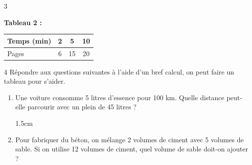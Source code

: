 \documentclass[a4paper]{book}
\begin{document}
{\begin{exerciceNote}{3}
\begin{minipage}{0.45\linewidth}
            \medskip

            \dotfill

            \medskip

            \dotfill
                                    
            \medskip 
            
            \dotfill
        \end{minipage}
        \hfill\vline\hfill
        \begin{minipage}{0.45\linewidth}
            \begin{center}
                \textbf{Tableau 2 :} \begin{tabular}{|l|c|c|c|} 
                \hline Temps (min) & 2 & 5 & 10 \\ 
                \hline Pages & 6 & 15 & 20 \\ \hline 
                \end{tabular}
            \end{center}

            \medskip
            
            \dotfill 
            
            \medskip 
            
            \dotfill
                        
            \medskip 
            
            \dotfill
        \end{minipage}           
    \end{exerciceNote}

    
\newpage


    \begin{exerciceNote}{4}
        Répondre aux questions suivantes à l'aide d'un bref calcul, on peut faire un tableau pour s'aider.

        \begin{enumerate}[leftmargin=*]
            \item Une voiture consomme 5 litres d'essence pour 100 km. Quelle distance peut-elle parcourir avec un plein de 45 litres ?

            \begin{ZoneReponse}{1.5cm}                
            \end{ZoneReponse}

            \item Pour fabriquer du béton, on mélange 2 volumes de ciment avec 5 volumes de sable. Si on utilise 12 volumes de ciment, quel volume de sable doit-on ajouter ?


\end{enumerate}
\end{exerciceNote}}
\end{document}
